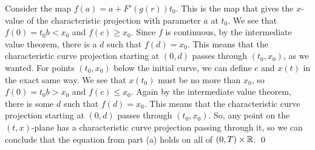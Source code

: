 \documentclass{article}
\begin{document}
\begin{enumerate}[(a)]
    \hop 
    Consider the map $f(a) = a + F'(g(r))t_0$. This is the map that gives the $x$-value of the characteristic projection with parameter $a$ at $t_0$. We see that $f(0) = t_0b < x_0$ and $f(c) \ge x_0$. Since $f$ is continuous, by the intermediate value theorem, there is a $d$ such that $f(d) = x_0$. This means that the characteristic curve projection starting at $(0,d)$ passes through $(t_0,x_0)$, as we wanted. 
    \hop 
    For points $(t_0, x_0)$ below the initial curve, we can define $c$ and $x(t)$ in the exact same way. We see that $x(t_0)$ must be no more than $x_0$, so $f(0) = t_0b > x_0$ and $f(c) \le x_0$. Again by the intermediate value theorem, there is some $d$ such that $f(d) = x_0$. This means that the characteristic curve projection starting at $(0,d)$ passes through $(t_0,x_0)$. 
    \hop 
    So, any point on the $(t,x)$-plane has a characteristic curve projection passing through it, so we can conclude that the equation from part (a) holds on all of $(0,T) \times \mathbb{R}$. \qed
\end{enumerate}
\end{document}
